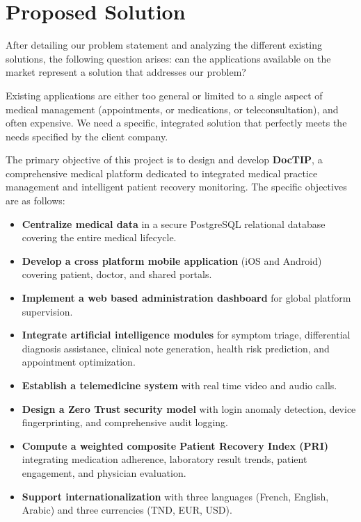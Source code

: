 \documentclass[12pt,a4paper,oneside]{report}
\begin{document}
\section{Proposed Solution}

After detailing our problem statement and analyzing the different existing solutions, the following question arises: can the applications available on the market represent a solution that addresses our problem?

Existing applications are either too general or limited to a single aspect of medical management (appointments, or medications, or teleconsultation), and often expensive. We need a specific, integrated solution that perfectly meets the needs specified by the client company.

The primary objective of this project is to design and develop \textbf{DocTIP}, a comprehensive medical platform dedicated to integrated medical practice management and intelligent patient recovery monitoring. The specific objectives are as follows:

\begin{itemize}
    \item \textbf{Centralize medical data} in a secure PostgreSQL relational database covering the entire medical lifecycle.
    \item \textbf{Develop a cross platform mobile application} (iOS and Android) covering patient, doctor, and shared portals.
    \item \textbf{Implement a web based administration dashboard} for global platform supervision.
    \item \textbf{Integrate artificial intelligence modules} for symptom triage, differential diagnosis assistance, clinical note generation, health risk prediction, and appointment optimization.
    \item \textbf{Establish a telemedicine system} with real time video and audio calls.
    \item \textbf{Design a Zero Trust security model} with login anomaly detection, device fingerprinting, and comprehensive audit logging.
    \item \textbf{Compute a weighted composite Patient Recovery Index (PRI)} integrating medication adherence, laboratory result trends, patient engagement, and physician evaluation.
    \item \textbf{Support internationalization} with three languages (French, English, Arabic) and three currencies (TND, EUR, USD).
\end{itemize}
\end{document}
